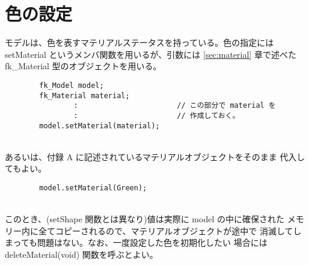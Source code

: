 \section{色の設定}
モデルは、色を表すマテリアルステータスを持っている。色の指定には
setMaterial というメンバ関数を用いるが、引数には \ref{sec:material} 章で述べた
fk\_Material 型のオブジェクトを用いる。
\\
\begin{screen}
\begin{verbatim}
        fk_Model model;
        fk_Material material;
                :                       // この部分で material を
                :                       // 作成しておく。
        model.setMaterial(material);
\end{verbatim}
\end{screen}
~ \\
あるいは、付録 A に記述されているマテリアルオブジェクトをそのまま
代入してもよい。
\\
\begin{screen}
\begin{verbatim}
        model.setMaterial(Green);
\end{verbatim}
\end{screen}
~ \\
このとき、(setShape 関数とは異なり)値は実際に model の中に確保された
メモリー内に全てコピーされるので、マテリアルオブジェクトが途中で
消滅してしまっても問題はない。なお、一度設定した色を初期化したい
場合には deleteMaterial(void) 関数を呼ぶとよい。

